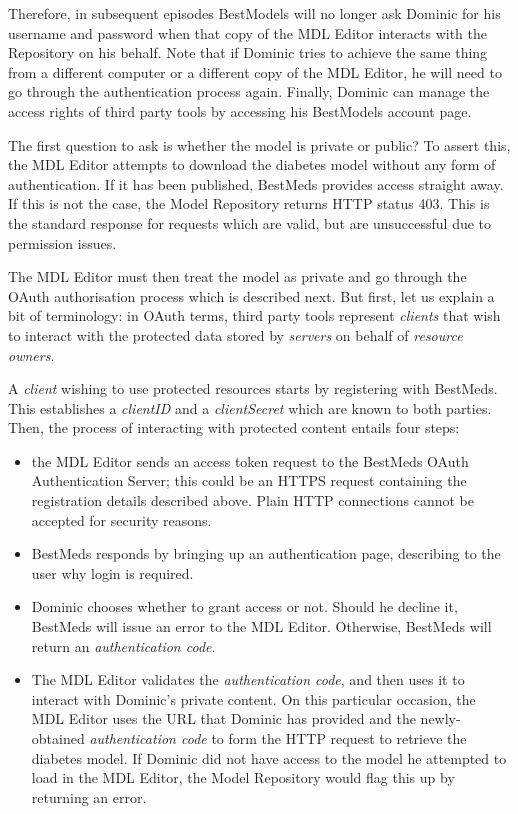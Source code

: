 Therefore, in subsequent episodes BestModels will no longer ask Dominic for his username and password when that copy of the MDL Editor interacts with the Repository on his behalf. Note that if Dominic tries to achieve the same thing from a different computer or a different copy of the MDL Editor, he will need to go through the authentication process again. Finally, Dominic can manage the access rights of third party tools by accessing his BestModels account page. 

\begin{techNote}
The first question to ask is whether the model is private or public? To assert this, the MDL Editor attempts to download the diabetes model without any form of authentication. If it has been published, BestMeds provides access straight away. If this is not the case, the Model Repository returns HTTP status 403. This is the standard response for requests which are valid, but are unsuccessful due to permission issues. 

The MDL Editor must then treat the model as private and go through the OAuth authorisation process which is described next. But first, let us explain a bit of terminology: in OAuth terms, third party tools represent \emph{clients} that wish to interact with the protected data stored by \emph{servers} on behalf of \emph{resource owners}. 

A \emph{client} wishing to use protected resources starts by registering with BestMeds. This establishes a \emph{clientID} and a \emph{clientSecret} which are known to both parties. Then, the process of interacting with protected content entails four steps:

\begin{itemize}
\item the MDL Editor sends an access token request to the BestMeds OAuth Authentication Server; this could be an HTTPS request containing the registration details described above. Plain HTTP connections cannot be accepted for security reasons.
\item BestMeds responds by bringing up an authentication page, describing to the user why login is required.
\item Dominic chooses whether to grant access or not. Should he decline it, BestMeds will issue an error to the MDL Editor. Otherwise, BestMeds will return an \emph{authentication code}. 
\item The MDL Editor validates the \emph{authentication code}, and then uses it to interact with Dominic's private content. On this particular occasion, the MDL Editor uses the URL that Dominic has provided and the newly-obtained \emph{authentication code} to form the HTTP request to retrieve the diabetes model. If Dominic did not have access to the model he attempted to load in the MDL Editor, the Model Repository would flag this up by returning an error. 
\end{itemize}
\end{techNote}

